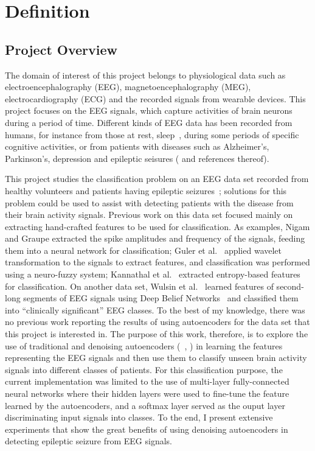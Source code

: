 \documentclass[12pt]{article}
\begin{document}
\maketitle

\section{Definition}

\subsection{Project Overview}
\noindent
The domain of interest of this project belongs to physiological data such as electroencephalography (EEG), magnetoencephalography (MEG), electrocardiography (ECG) and the recorded signals from wearable devices. This project focuses on the EEG signals, which capture activities of brain neurons during a period of time. Different kinds of EEG data has been recorded from humans, for instance from those at rest, sleep~\cite{langkvist2012sleep}, during some periods of specific cognitive activities, or from patients with diseases such as Alzheimer's, Parkinson's, depression and epileptic seisures (\cite{andrzejak2001indications} and references thereof).

This project studies the classification problem on an EEG data set recorded from healthy volunteers and patients having epileptic seizures~\cite{andrzejak2001indications}; solutions for this problem could be used to assist with detecting patients with the disease from their brain activity signals. Previous work on this data set focused mainly on extracting hand-crafted features to be used for classification. As examples, Nigam and Graupe \cite{nigam2004neural} extracted the spike amplitudes and frequency of the signals, feeding them into a neural network for classification; Guler et al.~\cite{guler2005recurrent} applied wavelet transformation to the signals to extract features, and classification was performed using a neuro-fuzzy system; Kannathal et al.~\cite{kannathal2005entropies} extracted entropy-based features for classification. On another data set, Wulsin et al.~\cite{wulsin2011modeling} learned features of second-long segments of EEG signals using Deep Belief Networks~\cite{hinton2006reducing} and classified them into ``clinically significant'' EEG classes. To the best of my knowledge, there was no previous work reporting the results of using autoencoders for the data set that this project is interested in. The purpose of this work, therefore, is to explore the use of traditional and denoising autoencoders (~\cite{bengio2007greedy}, \cite{vincent2010stacked}) in learning the features representing the EEG signals and then use them to classify unseen brain activity signals into different classes of patients. For this classification purpose, the current implementation was limited to the use of multi-layer fully-connected neural networks where their hidden layers were used to fine-tune the feature learned by the autoencoders, and a softmax layer served as the ouput layer discriminating input signals into classes. To the end, I present extensive experiments that show the great benefits of using denoising autoencoders in detecting epileptic seizure from EEG signals.
\end{document}
